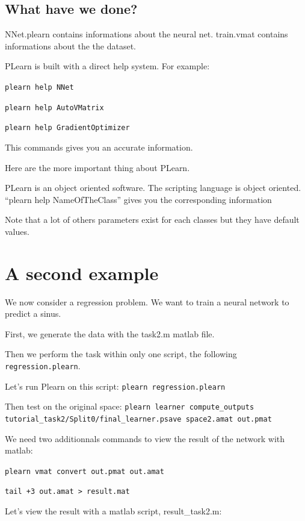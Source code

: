 \subsection{What have we done?}

NNet.plearn contains informations about the neural net. train.vmat contains informations about the the dataset.

PLearn is built with a direct help system. For example:

\texttt{plearn help NNet}

\texttt{plearn help AutoVMatrix}

\texttt{plearn help GradientOptimizer}

This commands gives you an accurate information.

Here are the more important thing about PLearn.

\begin{bf}PLearn is an object oriented software. The scripting language is object 
oriented. ``plearn help NameOfTheClass'' gives you the corresponding information
\end{bf}

Note that a lot of others parameters exist for each classes but they have default values.

\section{A second example}

We now consider a regression problem. We want to train a neural network to predict a sinus.

First, we generate the data with the task2.m matlab file.

Then we perform the task within only one script, the following \texttt{regression.plearn}.



Let's run Plearn on this script:
\texttt{plearn regression.plearn}

Then test on the original space:
\texttt{plearn learner compute\_outputs tutorial\_task2/Split0/final\_learner.psave space2.amat out.pmat}

We need two additionnals commands to view the result of the network with matlab:

\texttt{plearn vmat convert out.pmat out.amat}

\texttt{tail +3 out.amat > result.mat}

Let's view the result with a matlab script, result\_task2.m:

